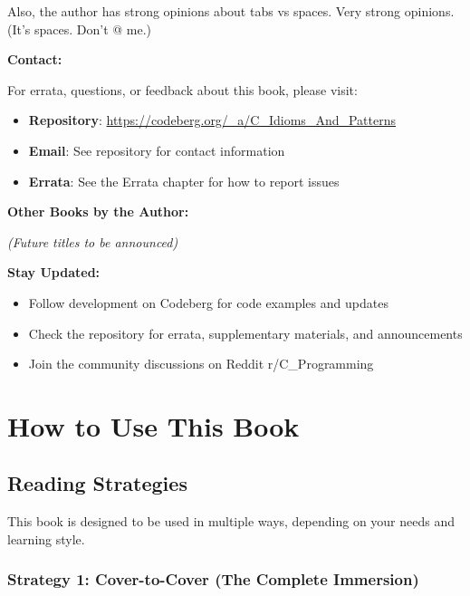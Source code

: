 \documentclass[11pt,openany]{book}
\begin{document}
Also, the author has strong opinions about tabs vs spaces. Very strong opinions. (It's spaces. Don't @ me.)

\vspace{2em}

\textbf{Contact:}

For errata, questions, or feedback about this book, please visit:

\begin{itemize}
    \item \textbf{Repository}: \url{https://codeberg.org/_a/C_Idioms_And_Patterns}
    \item \textbf{Email}: See repository for contact information
    \item \textbf{Errata}: See the Errata chapter for how to report issues
\end{itemize}

\vspace{1em}

\textbf{Other Books by the Author:}

\textit{(Future titles to be announced)}

\vspace{1em}

\textbf{Stay Updated:}

\begin{itemize}
    \item Follow development on Codeberg for code examples and updates
    \item Check the repository for errata, supplementary materials, and announcements
    \item Join the community discussions on Reddit r/C\_Programming
\end{itemize}

\clearpage

\tableofcontents

\chapter{How to Use This Book}

\section*{Reading Strategies}

This book is designed to be used in multiple ways, depending on your needs and learning style.

\subsection*{Strategy 1: Cover-to-Cover (The Complete Immersion)}
\end{document}
